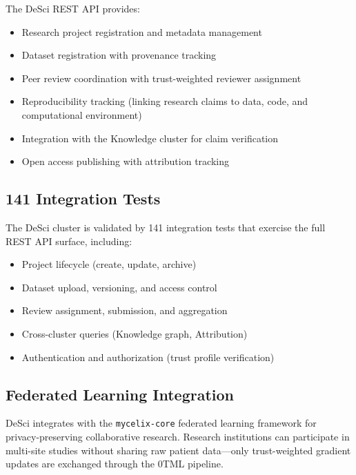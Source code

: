 \documentclass[12pt]{book}
\begin{document}
The DeSci REST API provides:

\begin{itemize}
  \item Research project registration and metadata management
  \item Dataset registration with provenance tracking
  \item Peer review coordination with trust-weighted reviewer assignment
  \item Reproducibility tracking (linking research claims to data,
    code, and computational environment)
  \item Integration with the Knowledge cluster for claim verification
  \item Open access publishing with attribution tracking
\end{itemize}

\subsection{141 Integration Tests}

The DeSci cluster is validated by 141 integration tests that exercise
the full REST API surface, including:

\begin{itemize}
  \item Project lifecycle (create, update, archive)
  \item Dataset upload, versioning, and access control
  \item Review assignment, submission, and aggregation
  \item Cross-cluster queries (Knowledge graph, Attribution)
  \item Authentication and authorization (trust profile verification)
\end{itemize}

\subsection{Federated Learning Integration}

DeSci integrates with the \texttt{mycelix-core} federated learning framework
for privacy-preserving collaborative research. Research institutions can
participate in multi-site studies without sharing raw patient data---only
trust-weighted gradient updates are exchanged through the 0TML pipeline.


\end{document}
